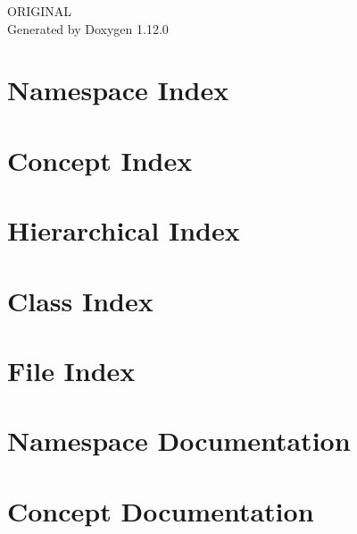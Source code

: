 \documentclass[twoside]{book}
\newcommand{\+}{\discretionary{\mbox{\scriptsize$\hookleftarrow$}}{}{}}
\newcommand{\clearemptydoublepage}{%
    \newpage{\pagestyle{empty}\cleardoublepage}%
  }
\begin{document}
  \raggedbottom
    \hypersetup{pageanchor=false,
                bookmarksnumbered=true,
                pdfencoding=unicode
               }
  \begin{titlepage}
  \vspace*{7cm}
  \begin{center}%
  {\Large ORIGINAL}\\
  \vspace*{1cm}
  {\large Generated by Doxygen 1.12.0}\\
  \end{center}
  \end{titlepage}
  \clearemptydoublepage
  \tableofcontents
  \clearemptydoublepage
  \hypersetup{pageanchor=true}

\chapter{Namespace Index}

\chapter{Concept Index}

\chapter{Hierarchical Index}

\chapter{Class Index}

\chapter{File Index}

\chapter{Namespace Documentation}

\chapter{Concept Documentation}









\end{document}
